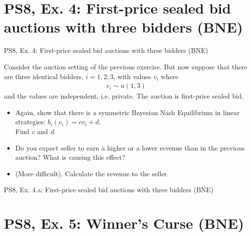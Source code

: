 \section{PS8, Ex. 4: First-price sealed bid auctions with three bidders (BNE)}

\begin{frame}{PS8, Ex. 4: First-price sealed bid auctions with three bidders (BNE)}
  \begin{multicols}{2}
    Consider the auction setting of the previous exercise. But now suppose that there are three identical bidders, $i = 1, 2, 3$, with values $v_i$ where
    \begin{align*}
      v_i\sim u(1, 3)
    \end{align*}
    and the values are independent, i.e. private. The auction is first-price sealed bid.
    \vfill\null\columnbreak
    \begin{itemize}
      \item[(a)] Again, show that there is a symmetric Bayesian Nash Equilibrium in linear strategies: $b_i(v_i) = cv_i + d$.\\
                 Find \textit{c} and \textit{d}.
      \item[(b)] Do you expect seller to earn a higher or a lower revenue than in the previous auction? What is causing this effect?
      \item[(b)] (More difficult). Calculate the revenue to the seller.
    \end{itemize}
    \vfill\null
  \end{multicols}
\end{frame}

\begin{frame}{PS8, Ex. 4.a: First-price sealed bid auctions with three bidders (BNE)}
  \begin{multicols}{2}
    \vfill\null\columnbreak
    \vfill\null\null
  \end{multicols}
\end{frame}



\section{PS8, Ex. 5: Winner's Curse (BNE)}

